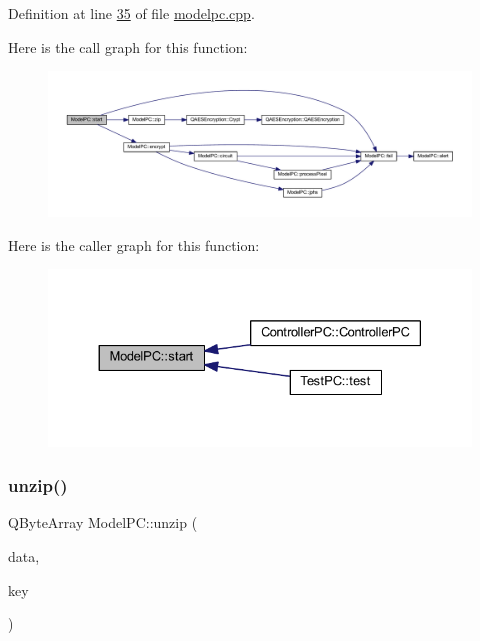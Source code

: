 Definition at line \mbox{\hyperlink{modelpc_8cpp_source_l00035}{35}} of file \mbox{\hyperlink{modelpc_8cpp_source}{modelpc.\+cpp}}.

Here is the call graph for this function\+:
\nopagebreak
\begin{figure}[H]
\begin{center}
\leavevmode
\includegraphics[width=350pt]{class_model_p_c_a3cae34fd5bcb06e8c1f8cfe7961bd270_cgraph}
\end{center}
\end{figure}
Here is the caller graph for this function\+:
\nopagebreak
\begin{figure}[H]
\begin{center}
\leavevmode
\includegraphics[width=330pt]{class_model_p_c_a3cae34fd5bcb06e8c1f8cfe7961bd270_icgraph}
\end{center}
\end{figure}
\mbox{\label{class_model_p_c_a6da88f166785a49f73b22c169f956fd0}} 
\subsubsection{\texorpdfstring{unzip()}{unzip()}}
{\footnotesize\ttfamily Q\+Byte\+Array Model\+P\+C\+::unzip (\begin{DoxyParamCaption}\item[{Q\+Byte\+Array}]{data,  }\item[{Q\+Byte\+Array}]{key }\end{DoxyParamCaption})}




